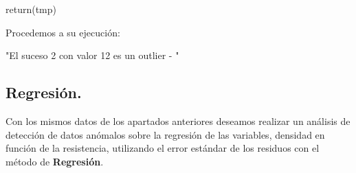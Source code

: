 \documentclass [a4paper] {article}
\begin{document}
\begin{enumerate}
\begin{Schunk}
\begin{Soutput}
{    return(tmp)
}
\end{Soutput}
\end{Schunk}

\bigskip
Procedemos a su ejecución:
\begin{Schunk}
\begin{Soutput}
[1] "El suceso 2 con valor 12 es un outlier - "
\end{Soutput}
\end{Schunk}
\end{enumerate}

\subsection{Regresión.}
\bigskip
Con los mismos datos de los apartados anteriores deseamos realizar un análisis de detección de datos 
anómalos sobre la regresión de las variables, densidad en función de la resistencia, utilizando el
error estándar de los residuos con el método de \textbf{Regresión}.
\end{document}
